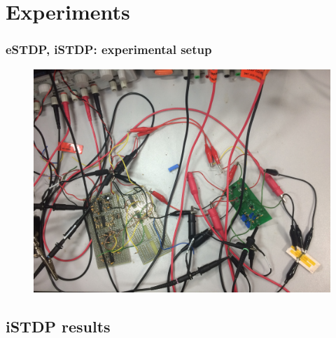 \documentclass[12pt, aspectratio=169]{beamer}
\begin{document}
\section{Experiments}

\begin{frame}
  \frametitle{eSTDP, iSTDP: experimental setup}
\begin{figure}
\includegraphics[width=0.65\linewidth]{mscs_experimental_setup}
\end{figure}
\end{frame}


\subsection{iSTDP results}
\end{document}
